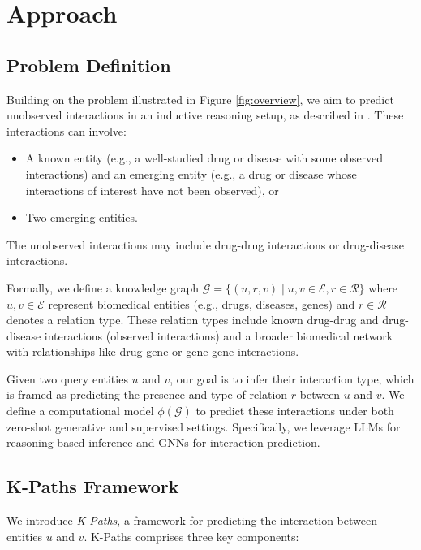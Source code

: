 \section{Approach} \label{sec:methods} 
\subsection{Problem Definition}
Building on the problem illustrated in Figure \ref{fig:overview}, we aim to predict unobserved interactions in an inductive reasoning setup, as described in \citet{zhang2023emergingdruginteractionprediction}. These interactions can involve:
\begin{itemize}
\item A known entity (e.g., a well-studied drug or disease with some observed interactions) and an emerging entity (e.g., a drug or disease whose interactions of interest have not been observed), or
\item Two emerging entities.
\end{itemize}
The unobserved interactions may include drug-drug interactions or drug-disease interactions.


Formally, we define a knowledge graph $\mathcal{G} = \{(u, r, v) \mid u, v \in \mathcal{E}, r \in \mathcal{R} \}$ where $u, v \in \mathcal{E}$ represent biomedical entities (e.g., drugs, diseases, genes) and $r \in \mathcal{R}$ denotes a relation type. These relation types include known drug-drug and drug-disease interactions (observed interactions) and a broader biomedical network with relationships like drug-gene or gene-gene interactions.

Given two query entities \( u\) and \( v\), our goal is to infer their interaction type, which is framed as predicting the presence and type of relation $r$ between $u$ and $v$.
We define a computational model \(\phi(\mathcal{G})\) to predict these interactions under both zero-shot generative and supervised settings.
Specifically, we leverage LLMs for reasoning-based inference and GNNs for interaction prediction. 

\subsection{K-Paths Framework}
We introduce \textit{K-Paths}, a framework for predicting the interaction between entities \( u \) and \( v \). K-Paths comprises three key components:

